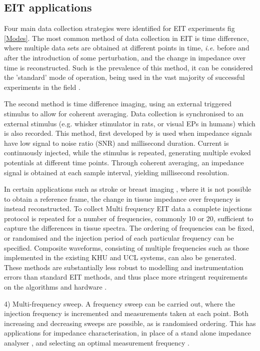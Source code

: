 \subsection{EIT applications}
Four main data collection strategies were identified for EIT experiments fig \ref{Modes}.  The most common method of data collection in EIT is time difference, where multiple data sets are obtained at different points in time, \emph{i.e.} before and after the introduction of some perturbation, and the change in impedance over time is reconstructed. Such is the prevalence of this method, it can be considered the 'standard' mode of operation, being used in the vast majority of successful experiments in the field \cite{bayford2012bioimpedance}.

The second method is time difference imaging, using an external triggered stimulus to allow for coherent averaging. Data collection is synchronised to an external stimulus (e.g. whisker stimulator in rats, or visual EPs in humans) which is also recorded. This method, first developed by \citet{Oh2011} is used when impedance signals have low signal to noise ratio (SNR) and millisecond duration. Current is continuously injected, while the stimulus is repeated, generating multiple evoked potentials at different time points. Through coherent averaging, an impedance signal is obtained at each sample interval, yielding millisecond resolution. 

In certain applications such as stroke \cite{Romsauerova2006} or breast imaging \cite{Halter}, where it is not possible to obtain a reference frame, the change in tissue impedance over frequency is instead reconstructed. To collect Multi frequency EIT data a complete injections protocol is repeated for a number of frequencies, commonly 10 or 20, sufficient to capture the differences in tissue spectra. The ordering of frequencies can be fixed, or randomised and the injection period of each particular frequency can be specified. Composite waveforms, consisting of multiple frequencies such as those implemented in the existing KHU \cite{Hun_Wi_2014} and UCL \cite{McEwan_2006} systems, can also be generated. These methods are substantially less robust to modelling and instrumentation errors than standard EIT methods, and thus place more stringent requirements on the algorithms and hardware \cite{Ahn2011} \cite{Malone2014}.

4) Multi-frequency sweep. A frequency sweep can be carried out, where the injection frequency is incremented and measurements taken at each point. Both increasing and decreasing sweeps are possible, as is randomised ordering. This has applications for impedance characterisation, in place of a stand alone impedance analyser \cite{Gabriel_2009}, and selecting an optimal measurement frequency \cite{VongerichtenASantosGAristovichK2013}.